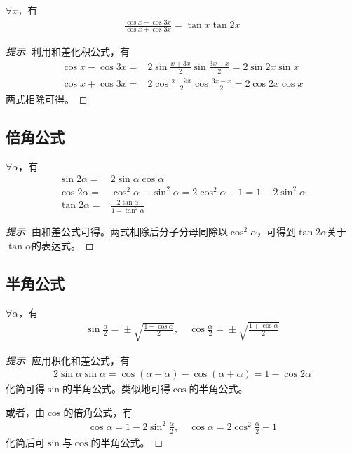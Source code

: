\begin{example}
  $\forall x$，有
  \begin{align*}
    \frac{\cos x-\cos 3x}{\cos x+\cos 3x} = \tan x \tan 2x
  \end{align*}
\end{example}
\begin{proof}[提示]
  利用和差化积公式，有
  \begin{align*}
    \cos x - \cos 3x ={}& 2\sin\frac{x + 3x}{2} \sin\frac{3x-x}{2} = 2\sin2x\sin x\\
    \cos x + \cos 3x ={}& 2\cos\frac{x + 3x}{2} \cos\frac{3x-x}{2} = 2\cos2x\cos x
  \end{align*}
  两式相除可得。
\end{proof}

\subsection{倍角公式}
\label{sec:double-angle-formula}

\begin{theorem}[倍角公式]$\forall \alpha$，有
  \begin{align*}
    \sin 2\alpha ={}& 2\sin\alpha\cos\alpha\\
    \cos 2\alpha ={}& \cos^2\alpha - \sin^2\alpha = 2\cos^2\alpha - 1 = 1 - 2\sin^2\alpha\\[5pt]
    \tan 2\alpha ={}& \frac{2\tan\alpha}{1 - \tan^2\alpha}
  \end{align*}
\end{theorem}
\begin{proof}[提示]
  由和差公式可得。两式相除后分子分母同除以$\cos^2\alpha$，可得到$\tan2\alpha$关于$\tan\alpha$的表达式。
\end{proof}

\subsection{半角公式}
\label{sec:half-angle-formula}

\begin{theorem}[正弦余弦半角公式]$\forall \alpha$，有
  \begin{align*}
    \sin\frac\alpha2 ={} \pm\sqrt{\frac{1-\cos\alpha}2},\quad
    \cos\frac\alpha2 ={} \pm\sqrt{\frac{1+\cos\alpha}2}
  \end{align*}
\end{theorem}
\begin{proof}[提示]
  应用积化和差公式，有
  \begin{align*}
    2\sin\alpha\sin\alpha = \cos(\alpha - \alpha) - \cos(\alpha + \alpha) = 1 - \cos2\alpha
  \end{align*}
  化简可得$\sin$的半角公式。类似地可得$\cos$的半角公式。

  或者，由$\cos$的倍角公式，有
  \begin{align*}
    \cos\alpha = 1 - 2\sin^2\frac\alpha2, \quad \cos\alpha = 2\cos^2\frac\alpha2 - 1
  \end{align*}
  化简后可$\sin$与$\cos$的半角公式。
\end{proof}

